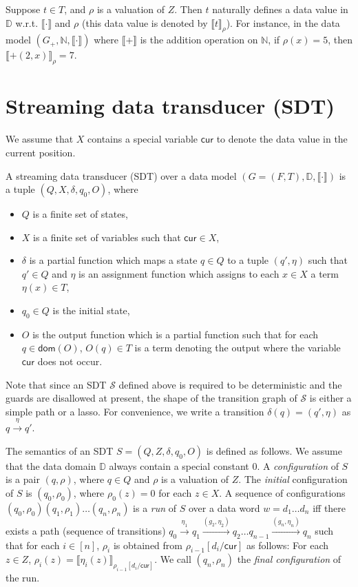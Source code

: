 \documentclass[runningheads,a4paper]{llncs}
\newcommand{\eval}[2]{\llbracket#1\rrbracket_{#2}}
\newcommand\cur{\mathsf{cur}}
\newcommand\dom{\mathsf{dom}}
\newcommand\dd{\mathbb{D}}
\newcommand\nat{\mathbb{N}}
\newcommand\Ss{\mathcal{S}}
\begin{document}
Suppose $t \in T$, and $\rho$ is a valuation of $Z$. Then $t$ naturally defines a data value in $\dd$ w.r.t. $\llbracket \cdot \rrbracket$ and $\rho$ (this data value is denoted by $\eval{t}{\rho}$). For instance, in the data model $(G_+, \nat, \llbracket \cdot \rrbracket)$ where $\llbracket + \rrbracket$ is the addition operation on $\nat$, if $\rho(x) = 5$, then $\eval{+(2,x)}{\rho}=7$.

 
\section{Streaming data transducer (SDT)}

We assume that $X$ contains a special variable $\cur$ to denote the data value in the current position. 


A streaming data transducer (SDT) over a data model $(G=(F, T), \dd, \llbracket \cdot \rrbracket)$ is a tuple $(Q, X, \delta, q_0, O)$, where 
\begin{itemize}
\item $Q$ is a finite set of states, 

\item $X$ is a finite set of variables such that $\cur \in X$, 

\item $\delta$ is a partial function which maps a state $q \in Q$ to a tuple $(q',\eta)$  such that $q' \in Q$ and $\eta$ is an assignment function which assigns to each $x \in X$ a term $\eta(x) \in T$, 

\item $q_0 \in Q$ is the initial state, 

\item $O$ is the output function which is a partial function such that for each $q \in \dom(O)$, $O(q) \in T$ is a term denoting the output where the variable $\cur$ does not occur.
\end{itemize}
Note that since an SDT $\Ss$ defined above is required to be deterministic and the guards are disallowed at present, the shape of the transition graph of $\Ss$ is either a simple path or a lasso. For convenience, we write a transition $\delta(q) = (q',\eta)$ as $q \xrightarrow{\eta} q'$.


The semantics of an SDT $S = (Q, Z, \delta, q_0, O)$  is defined as follows. We assume that the data domain $\dd$ always contain a special constant $0$. A \emph{configuration} of $S$ is a pair $(q, \rho)$, where $q \in Q$ and $\rho$ is a valuation of $Z$. The \emph{initial} configuration of $S$ is $(q_0,\rho_0)$, where $\rho_0(z)=0$ for each $z \in X$. A sequence of configurations $(q_0,\rho_0)(q_1,\rho_1)\ldots(q_n,\rho_n)$ is
a \emph{run} of $S$ over a data word $w=d_1 \dots d_n$ iff there exists a path (sequence of transitions) $q_0 \xrightarrow{\eta_1} q_1 \xrightarrow{(g_2,\eta_2)} q_2 \dots q_{n-1} \xrightarrow{(g_n, \eta_n)} q_n$ such that for each $i \in [n]$, $\rho_i$ is obtained from $\rho_{i-1}[d_i/\cur]$ as follows: For each $z \in Z$, $\rho_i(z)=\eval{\eta_i(z)}{\rho_{i-1}[d_i/\cur]}$.
We call $(q_n,\rho_n)$ the \emph{final configuration} of the run. %
\end{document}
